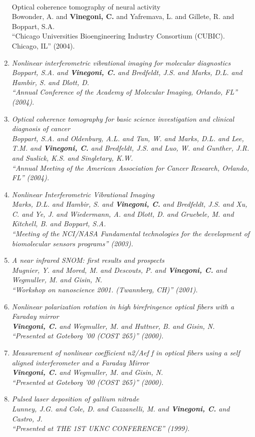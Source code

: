 \documentclass{resume}
\begin{document}
\begin{category}{~~}
\begin{enumerate}
Optical coherence tomography of neural activity \\ Bowonder, A. and {\bf Vinegoni, C.} and Yafremava, L. and Gillete, R. and Boppart, S.A. \\ ``Chicago Universities Bioengineering Industry Consortium (CUBIC). Chicago, IL''  (2004). \item \it Nonlinear interferometric vibrational imaging for molecular diagnostics \\ Boppart, S.A. and {\bf Vinegoni, C.} and Bredfeldt, J.S. and Marks, D.L. and Hambir, S. and Dlott, D. \\ ``Annual Conference of the Academy of Molecular Imaging, Orlando, FL''  (2004). \item \it Optical coherence tomography for basic science investigation and clinical diagnosis of cancer \\ Boppart, S.A. and Oldenburg, A.L. and Tan, W. and Marks, D.L. and Lee, T.M. and {\bf Vinegoni, C.} and Bredfeldt, J.S. and Luo, W. and Gunther, J.R. and Suslick, K.S. and Singletary, K.W. \\ ``Annual Meeting of the American Association for Cancer Research, Orlando, FL''  (2004). \item \it Nonlinear Interferometric Vibrational Imaging \\ Marks, D.L. and Hambir, S. and {\bf Vinegoni, C.} and Bredfeldt, J.S. and Xu, C. and Ye, J. and Wiedermann, A. and Dlott, D. and Gruebele, M. and Kitchell, B. and Boppart, S.A. \\ ``Meeting of the NCI/NASA Fundamental technologies for the development of biomolecular sensors programs''  (2003). \item \it A near infrared SNOM: first results and prospects \\ Mugnier, Y. and Mored, M. and Descouts, P. and {\bf Vinegoni, C.} and Wegmuller, M. and Gisin, N. \\ ``Workshop on nanoscience 2001. (Twannberg, CH)''  (2001). \item \it Nonlinear polarization rotation in high birefringence optical fibers with a Faraday mirror \\ {\bf Vinegoni, C.} and Wegmuller, M. and Huttner, B. and Gisin, N. \\ ``Presented at Goteborg ’00 (COST 265)''  (2000). \item \it Measurement of nonlinear coefficient n2/Aef f in optical fibers using a self aligned interferometer and a Faraday Mirror \\ {\bf Vinegoni, C.} and Wegmuller, M. and Gisin, N. \\ ``Presented at Goteborg ’00 (COST 265)''  (2000). \item \it Pulsed laser deposition of gallium nitrade \\ Lunney, J.G. and Cole, D. and Cazzanelli, M. and {\bf Vinegoni, C.} and Castro, J. \\ ``Presented at THE 1ST UKNC CONFERENCE''  (1999). 


\end{enumerate}
\end{category}
\end{document}
